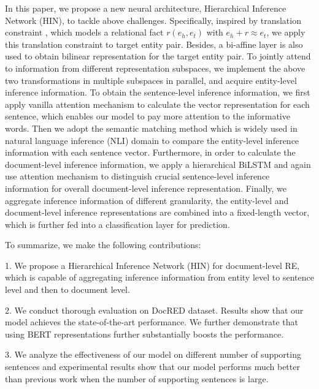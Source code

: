 \documentclass[runningheads]{llncs}
\begin{document}
In this paper, we propose a new neural architecture, Hierarchical Inference Network (HIN), to tackle above challenges.
Specifically, inspired by translation constraint \cite{bordes2013translating}, which models a relational fact $r({e}_{h}, {e}_{t})$ with $e_{h} + r \approx e_{t}$,
we apply this translation constraint to target entity pair.
Besides, a bi-affine layer is also used to obtain bilinear representation for the target entity pair.
To jointly attend to information from different representation subspaces, we implement the above two transformations in multiple subspaces in parallel, and acquire entity-level inference information.
To obtain the sentence-level inference information, we first apply vanilla attention mechanism to calculate the vector representation for each sentence, which enables our model to pay more attention to the informative words.
Then we adopt the semantic matching method which is widely used in natural language inference (NLI) domain to compare the entity-level inference information with each sentence vector. 
Furthermore, in order to calculate the document-level inference information, we apply a hierarchical BiLSTM and again use attention mechanism to distinguish crucial sentence-level inference information for overall document-level inference representation.
Finally, we aggregate inference information of different granularity, the entity-level and document-level inference representations are combined into a fixed-length vector, 
which is further fed into a classification layer for prediction.

To summarize, we make the following contributions:

1. We propose a Hierarchical Inference Network (HIN) for document-level RE, which is capable of aggregating inference information from entity level to sentence level and then to document level.

2. We conduct thorough evaluation on DocRED dataset. Results show that our model achieves the state-of-the-art performance. We further demonstrate that using BERT representations further substantially boosts the performance.

3. We analyze the effectiveness of our model on different number of supporting sentences and experimental results show that our model performs much better than previous work when the number of supporting sentences is large.
\end{document}
